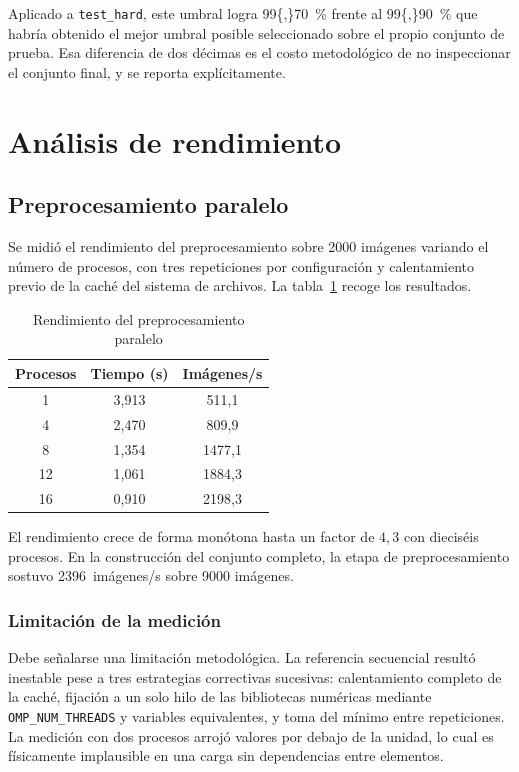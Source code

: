 \documentclass[10pt,twocolumn,letterpaper]{article}
\begin{document}
Aplicado a \texttt{test\_hard}, este umbral logra \SI{99{,}70}{\percent}
frente al \SI{99{,}90}{\percent} que habría obtenido el mejor umbral
posible seleccionado sobre el propio conjunto de prueba. Esa diferencia de
dos décimas es el costo metodológico de no inspeccionar el conjunto final,
y se reporta explícitamente.

\section{Análisis de rendimiento}

\subsection{Preprocesamiento paralelo}

Se midió el rendimiento del preprocesamiento sobre \num{2000} imágenes
variando el número de procesos, con tres repeticiones por configuración y
calentamiento previo de la caché del sistema de archivos. La
tabla~\ref{tab:throughput} recoge los resultados.

\begin{table}[t]
\caption{Rendimiento del preprocesamiento paralelo}
\label{tab:throughput}
\centering\small
\begin{tabular}{ccc}
\toprule
\textbf{Procesos} & \textbf{Tiempo (s)} & \textbf{Imágenes/s} \\
\midrule
1  & 3,913 & 511,1 \\
4  & 2,470 & 809,9 \\
8  & 1,354 & 1477,1 \\
12 & 1,061 & 1884,3 \\
16 & 0,910 & 2198,3 \\
\bottomrule
\end{tabular}
\end{table}

El rendimiento crece de forma monótona hasta un factor de $4{,}3$ con
dieciséis procesos. En la construcción del conjunto completo, la etapa de
preprocesamiento sostuvo \num{2396}~im\'agenes/s sobre
\num{9000} imágenes.

\subsubsection{Limitación de la medición}

Debe señalarse una limitación metodológica. La referencia secuencial
resultó inestable pese a tres estrategias correctivas sucesivas:
calentamiento completo de la caché, fijación a un solo hilo de las
bibliotecas numéricas mediante \texttt{OMP\_NUM\_THREADS} y variables
equivalentes, y toma del mínimo entre repeticiones. La medición con dos
procesos arrojó valores por debajo de la unidad, lo cual es
físicamente implausible en una carga sin dependencias entre elementos.
\end{document}
